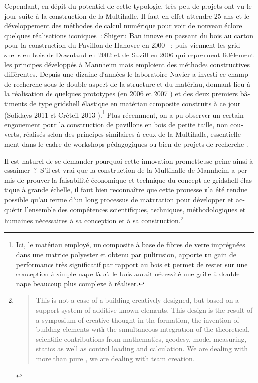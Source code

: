 \begin{otherlanguage}{french}
Cependant, en dépit du potentiel de cette typologie, très peu de projets ont vu le jour suite à la construction de la Multihalle. Il faut en effet attendre 25 ans et le développement des méthodes de calcul numérique pour voir de nouveau éclore quelques réalisations iconiques~: Shigeru Ban innove en passant du bois au carton pour la construction du Pavillon de Hanovre en 2000 \cite{Ban2006}~; puis viennent les gridshells en bois de Downland en 2002 \cite{Harris2002} et de Savill en 2006 \cite{Harris2008} qui reprennent fidèlement les principes développés à Mannheim mais emploient des méthodes constructives différentes. Depuis une dizaine d'années le laboratoire Navier a investi ce champ de recherche sous le double aspect de la structure et du matériau, donnant lieu à la réalisation de quelques prototypes (en 2006 et 2007 \cite{Douthe2006,Douthe2010a}) et des deux premiers bâtiments de type gridshell élastique en matériau composite construits à ce jour (Solidays 2011 \cite{Baverel2012} et Créteil 2013 \cite{DuPeloux2016}).\footnote{Ici, le matériau employé, un composite à base de fibres de verre imprégnées dans une matrice polyester et obtenu par pultrusion, apporte un gain de performance très significatif par rapport au bois et permet de rester sur une conception à simple nape là où le bois aurait nécessité une grille à double nape beaucoup plus complexe à réaliser.} Plus récemment, on a pu observer un certain engouement pour la construction de pavillons en bois de petite taille, non couverts, réalisés selon des principes similaires à ceux de la Multihalle, essentiellement dans le cadre de workshops pédagogiques ou bien de projets de recherche \cite{DAmico2014,Naicu2014,DAmico2015a,Mork2016}.

Il est naturel de se demander pourquoi cette innovation prometteuse peine ainsi à essaimer~?~S'il est vrai que la construction de la Multihalle de Mannheim a permis de prouver la faisabilité économique et technique du concept de gridshell élastique à grande échelle, il faut bien reconnaître que cette prouesse n'a été rendue possible qu'au terme d'un long processus de maturation pour développer et acquérir l'ensemble des compétences scientifiques, techniques, méthodologiques et humaines nécessaires à sa conception et à sa construction.\footnote{\blockcquote[Georg Lewenton][p.~201]{IL13}{This is not a case of a building creatively designed, but based on a support system of additive known elements. This design is the result of a symposium of creative thought in the formation, the invention of building elements with the simultaneous integration of the theoretical, scientific contributions from mathematics, geodesy, model measuring, statics as well as control loading and calculation. We are dealing with more than pure , we are dealing with team creation.}}


\end{otherlanguage}
